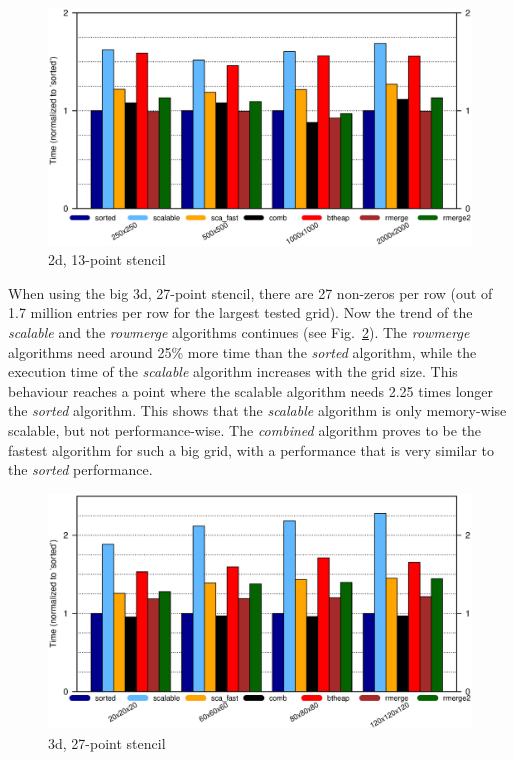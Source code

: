 \begin{figure}[tbp]
	\centering
	\includegraphics[width=1.1\textwidth, trim={0 7.3cm 0 1cm},clip]{seq_2d13point}
	\caption{2d, 13-point stencil} 
	\label{fig:seq2d13point}
\end{figure}


When using the big 3d, 27-point stencil, there are 27 non-zeros per row (out of 1.7 million entries per row for the largest tested grid). Now the trend of the \textit{scalable} and the \textit{rowmerge} algorithms continues (see Fig.~\ref{fig:seq3d27point}). The \textit{rowmerge} algorithms need around 25\% more time than the \textit{sorted} algorithm, while the execution time of the \textit{scalable} algorithm increases with the grid size. This behaviour reaches a point where the scalable algorithm needs 2.25 times longer the \textit{sorted} algorithm. This shows that the \textit{scalable} algorithm is only memory-wise scalable, but not performance-wise. The \textit{combined} algorithm proves to be the fastest algorithm for such a big grid, with a performance that is very similar to the \textit{sorted} performance. 

\begin{figure}[tbp]
	\centering
	\includegraphics[width=1.05\textwidth, trim={0 7.3cm 0 1cm},clip]{seq_3d27point}
	\caption{3d, 27-point stencil} 
	\label{fig:seq3d27point}
\end{figure}

